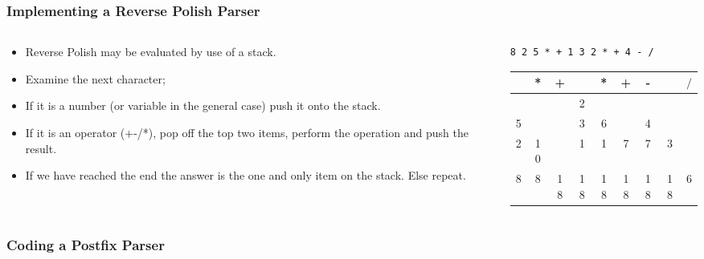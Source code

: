 \begin{frame}[fragile]
\frametitle{Implementing a Reverse Polish Parser}
\begin{columns}[T]

\begin{column}{0.45\textwidth}
\begin{itemize}[<+->]
\item Reverse Polish may be evaluated by use of a stack.
\item Examine the next character;
\item If it is a number (or variable in the general case)
push it onto the stack.
\item If it is an operator (+-/*), pop off the top two
items, perform the operation and push the result.
\item If we have reached the end the answer is the one and only
item on the stack. Else repeat.
\end{itemize}
\end{column}

\pause
\begin{column}{0.45\textwidth}
\begin{verbatim}
8 2 5 * + 1 3 2 * + 4 - /
\end{verbatim}
\begin{center}
\begin{tabular}{|c|c|c|c|c|c|c|c|c|}\hline
   & * & + &   & * & + & - &   & $/$ \\ \hline
   &   &   & 2 &   &   &   &   &     \\
 5 &   &   & 3 & 6 &   & 4 &   &     \\
 2 & 10&   & 1 & 1 & 7 & 7 & 3 &     \\
 8 & 8 & 18& 18& 18& 18& 18& 18& 6   \\ \hline
\end{tabular}
\end{center}
\end{column}

\end{columns}
\end{frame}


\begin{frame}[fragile]
\frametitle{Coding a Postfix Parser}
\begin{columns}[T]

\begin{column}{0.55\textwidth}

\end{column}

\pause
\begin{column}{0.35\textwidth}
\pause
{}
\pause
{}
\end{column}

\end{columns}
\end{frame}

